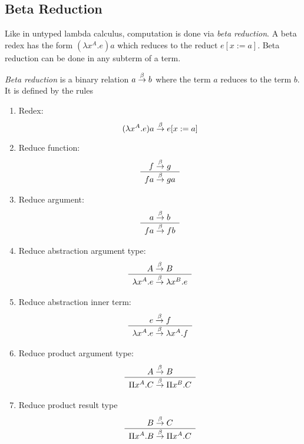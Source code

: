 \subsection{Beta Reduction}

Like in untyped lambda calculus, computation is done via \emph{beta reduction}.
A beta redex has the form $(\lambda x^A. e) a$ which reduces to the reduct
$e[x:=a]$. Beta reduction can be done in any subterm of a term.

\begin{definition}
    \emph{Beta reduction}
    is a binary relation $a \stackrel{\beta}{\to} b$ where the term $a$
    reduces to the term $b$. It is defined by the rules
    \begin{enumerate}
        \item Redex:
            $$
                (\lambda x^A. e) a \stackrel{\beta}{\to} e[x:=a]
            $$

        \item Reduce function:
            $$
                \begin{array}{c} 
                    f \stackrel{\beta}{\to} g
                 \\ \hline 
                    f a \stackrel{\beta}{\to} g a
                \end{array}
            $$

        \item Reduce argument:
            $$
                \begin{array}{c} 
                    a \stackrel{\beta}{\to} b
                 \\ \hline 
                    f a \stackrel{\beta}{\to} f b
                \end{array}
            $$

        \item Reduce abstraction argument type:
            $$
                \begin{array}{c} 
                    A \stackrel{\beta}{\to} B
                 \\ \hline 
                    \lambda x^A. e \stackrel{\beta}{\to} \lambda x^B . e
                \end{array}
            $$

        \item Reduce abstraction inner term:
            $$
                \begin{array}{c} 
                    e \stackrel{\beta}{\to} f
                 \\ \hline 
                    \lambda x^A. e \stackrel{\beta}{\to} \lambda x^A. f
                \end{array}
            $$

        \item Reduce product argument type:
            $$
                \begin{array}{c} 
                    A \stackrel{\beta}{\to} B
                 \\ \hline 
                    \Pi x^A. C \stackrel{\beta}{\to} \Pi x^B . C
                \end{array}
            $$

        \item Reduce product result type
            $$
                \begin{array}{c} 
                    B \stackrel{\beta}{\to} C
                 \\ \hline 
                    \Pi x^A. B \stackrel{\beta}{\to} \Pi x^A. C
                \end{array}
            $$
    \end{enumerate}
\end{definition}

